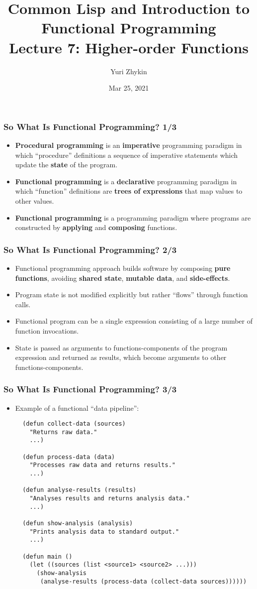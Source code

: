 \documentclass{beamer}
\title{
  Common Lisp and Introduction to Functional Programming \\
  Lecture 7: Higher-order Functions
}
\author{Yuri Zhykin}
\date{Mar 25, 2021}
\begin{document}
\frame{\titlepage}

\begin{frame}[fragile]
  \frametitle{So What Is Functional Programming? 1/3}
  \begin{itemize}
  \item \textbf{Procedural programming} is an \textbf{imperative} programming
    paradigm in which ``procedure'' definitions a sequence of imperative
    statements which update the \textbf{state} of the program.
  \item \textbf{Functional programming} is a \textbf{declarative} programming
    paradigm in which ``function'' definitions are \textbf{trees of expressions}
    that map values to other values.
  \item \textbf{Functional programming} is a programming paradigm where programs
    are constructed by \textbf{applying} and \textbf{composing} functions.
  \end{itemize}
\end{frame}

\begin{frame}[fragile]
  \frametitle{So What Is Functional Programming? 2/3}
  \begin{itemize}
  \item Functional programming approach builds software by composing
    \textbf{pure functions}, avoiding \textbf{shared state}, \textbf{mutable
      data}, and \textbf{side-effects}.
  \item Program state is not modified explicitly but rather ``flows'' through
    function calls.
  \item Functional program can be a single expression consisting of a large
    number of function invocations.
  \item State is passed as arguments to functions-components of the program
    expression and returned as results, which become arguments to other
    functions-components.
  \end{itemize}
\end{frame}

\begin{frame}[fragile]
  \frametitle{So What Is Functional Programming? 3/3}
  \begin{itemize}
  \item Example of a functional ``data pipeline'':
\begin{verbatim}
  (defun collect-data (sources)
    "Returns raw data."
    ...)

  (defun process-data (data)
    "Processes raw data and returns results."
    ...)

  (defun analyse-results (results)
    "Analyses results and returns analysis data."
    ...)

  (defun show-analysis (analysis)
    "Prints analysis data to standard output."
    ...)

  (defun main ()
    (let ((sources (list <source1> <source2> ...)))
      (show-analysis 
       (analyse-results (process-data (collect-data sources))))))
\end{verbatim}
  \end{itemize}
\end{frame}
\end{document}
